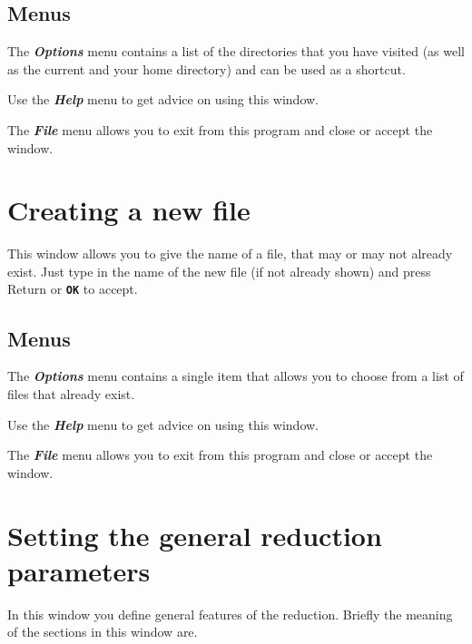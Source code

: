 \documentclass[11pt]{article}
\newcommand{\xlabel}[1]{}
\newcommand{\butt}[1]{{\bf \tt #1}}
\newcommand{\menu}[1]{{\bf \em #1}}
\begin{document}
\subsection{Menus \xlabel{CCDGetImageNameMenu}}

The \menu{Options} menu contains a list of the directories that you
have visited (as well as the current and your home directory) and can
be used as a shortcut.

Use the \menu{Help} menu to get advice on using this window.

The \menu{File} menu allows you to exit from this program and close or
accept the window.






\section{Creating a new file \xlabel{CCDNewFileNameWindow}}
This window allows you to give the name of a file, that may or may not
already exist. Just type in the name of the new file (if not already
shown) and press Return or \butt{OK} to accept.

\subsection{Menus \xlabel{CCDNewFileNameMenu}}
The \menu{Options} menu contains a single item that allows you to choose
from a list of files that already exist.

Use the \menu{Help} menu to get advice on using this window.

The \menu{File} menu allows you to exit from this program and close or
accept the window.

\section{Setting\xlabel{CCDSetGenGlobalsWindow}\label{CCDSetGenGlobalsWindow} 
         the general reduction parameters}
In this window you define general features of the reduction. Briefly
the meaning of the sections in this window are.
\end{document}
